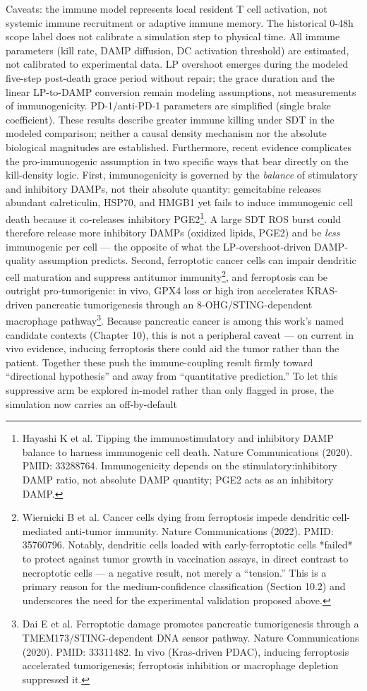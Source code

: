\documentclass[11pt,twoside,openright]{report}
\begin{document}
Caveats: the immune model represents local resident T cell activation, not systemic immune recruitment or adaptive immune memory. The historical 0-48h scope label does not calibrate a simulation step to physical time. All immune parameters (kill rate, DAMP diffusion, DC activation threshold) are estimated, not calibrated to experimental data. LP overshoot emerges during the modeled five-step post-death grace period without repair; the grace duration and the linear LP-to-DAMP conversion remain modeling assumptions, not measurements of immunogenicity. PD-1/anti-PD-1 parameters are simplified (single brake coefficient). These results describe greater immune killing under SDT in the modeled comparison; neither a causal density mechanism nor the absolute biological magnitudes are established. Furthermore, recent evidence complicates the pro-immunogenic assumption in two specific ways that bear directly on the kill-density logic. First, immunogenicity is governed by the \textit{balance} of stimulatory and inhibitory DAMPs, not their absolute quantity: gemcitabine releases abundant calreticulin, HSP70, and HMGB1 yet fails to induce immunogenic cell death because it co-releases inhibitory PGE2\footnote{Hayashi K et al. Tipping the immunostimulatory and inhibitory DAMP balance to harness immunogenic cell death. Nature Communications (2020). PMID: 33288764. Immunogenicity depends on the stimulatory:inhibitory DAMP ratio, not absolute DAMP quantity; PGE2 acts as an inhibitory DAMP.}. A large SDT ROS burst could therefore release more inhibitory DAMPs (oxidized lipids, PGE2) and be \textit{less} immunogenic per cell --- the opposite of what the LP-overshoot-driven DAMP-quality assumption predicts. Second, ferroptotic cancer cells can impair dendritic cell maturation and suppress antitumor immunity\footnote{Wiernicki B et al. Cancer cells dying from ferroptosis impede dendritic cell-mediated anti-tumor immunity. Nature Communications (2022). PMID: 35760796. Notably, dendritic cells loaded with early-ferroptotic cells *failed* to protect against tumor growth in vaccination assays, in direct contrast to necroptotic cells --- a negative result, not merely a ``tension.'' This is a primary reason for the medium-confidence classification (Section 10.2) and underscores the need for the experimental validation proposed above.}, and ferroptosis can be outright pro-tumorigenic: in vivo, GPX4 loss or high iron accelerates KRAS-driven pancreatic tumorigenesis through an 8-OHG/STING-dependent macrophage pathway\footnote{Dai E et al. Ferroptotic damage promotes pancreatic tumorigenesis through a TMEM173/STING-dependent DNA sensor pathway. Nature Communications (2020). PMID: 33311482. In vivo (Kras-driven PDAC), inducing ferroptosis accelerated tumorigenesis; ferroptosis inhibition or macrophage depletion suppressed it.}. Because pancreatic cancer is among this work's named candidate contexts (Chapter 10), this is not a peripheral caveat --- on current in vivo evidence, inducing ferroptosis there could aid the tumor rather than the patient. Together these push the immune-coupling result firmly toward ``directional hypothesis'' and away from ``quantitative prediction.'' To let this suppressive arm be explored in-model rather than only flagged in prose, the simulation now carries an off-by-default 
\end{document}

